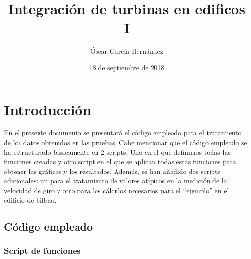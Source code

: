 \documentclass[]{article}
\title{Integración de turbinas en edificos I}
\author{Óscar García Hernández}
\date{18 de septiembre de 2018}
\begin{document}
\maketitle

\section{Introducción}\label{introduccion}

En el presente documento se presentará el código empleado para el
tratamiento de los datos obtenidos en las pruebas. Cabe mencionar que el
código empleado se ha estructurado básicamente en 2 scripts. Uno en el
que definimos todas las funciones creadas y otro script en el que se
aplican todas estas funciones para obtener las gráficas y los
resultados. Además, se han añadido dos scripts adicionales: un para el
tratamiento de valores atípicos en la medición de la velocidad de giro y
otro para los cálculos necesarios para el ``ejemplo'' en el edificio de
bilbao.

\subsection{Código empleado}\label{codigo-empleado}

\subsubsection{Script de funciones}\label{script-de-funciones}
\end{document}
